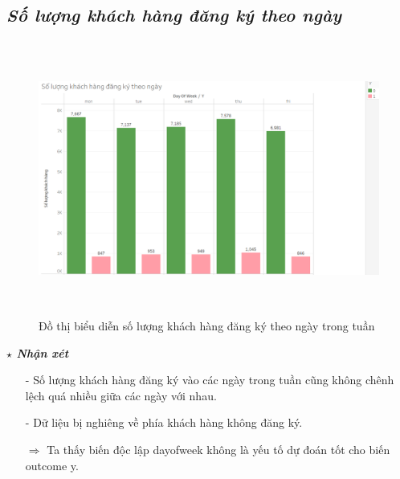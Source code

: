 \documentclass{report}
\begin{document}
\subsection{\textit{Số lượng khách hàng đăng ký theo ngày}}
         \begin{center}
        \begin{figure}[htp]
    	\begin{center}
    		\includegraphics[width=15cm, height=9cm]{images/hinh5.png}
    	\end{center}
    		\caption{Đồ thị biểu diễn số lượng khách hàng đăng ký theo ngày trong tuần}
    \end{figure}
    \end{center}
    \fontsize{13}{14}\selectfont \textbf{$\star$\textit{ Nhận xét}}
    \begin{enumerate}
        \item[- ] Số lượng khách hàng đăng ký vào các ngày trong tuần cũng không chênh lệch quá nhiều giữa các ngày với nhau.
        \item[- ] Dữ liệu bị nghiêng về phía khách hàng không đăng ký.
        \item [$\Rightarrow$] Ta thấy biến độc lập dayofweek không là yếu tố dự đoán tốt cho biến outcome y.
    \end{enumerate}
\pagebreak
\end{document}

